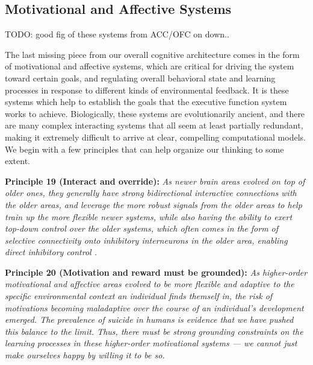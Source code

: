 \documentclass[11pt,twoside]{article}
\begin{document}
\subsection{Motivational and Affective Systems}

TODO: good fig of these systems from ACC/OFC on down..

The last missing piece from our overall cognitive architecture comes
in the form of motivational and affective systems, which are critical
for driving the system toward certain goals, and regulating overall
behavioral state and learning processes in response to different kinds
of environmental feedback.  It is these systems which help to
establish the goals that the executive function system works to
achieve.  Biologically, these systems are evolutionarily ancient, and
there are many complex interacting systems that all seem at least
partially redundant, making it extremely difficult to arrive at clear,
compelling computational models.  We begin with a few principles that
can help organize our thinking to some extent.

{\bf Principle 19 (Interact and override):} {\em As newer brain areas
  evolved on top of older ones, they generally have strong
  bidirectional interactive connections with the older areas, and
  leverage the more robust signals from the older areas to help train
  up the more flexible newer systems, while also having the ability to
  exert top-down control over the older systems, which often comes in
  the form of selective connectivity onto inhibitory interneurons in
  the older area, enabling direct inhibitory control
  \cite{MunakataEtAl11}.}

{\bf Principle 20 (Motivation and reward must be grounded):} {\em As
  higher-order motivational and affective areas evolved to be more
  flexible and adaptive to the specific environmental context an
  individual finds themself in, the risk of motivations becoming
  maladaptive over the course of an individual's development emerged.
  The prevalence of suicide in humans is evidence that we have pushed
  this balance to the limit.  Thus, there must be strong grounding
  constraints on the learning processes in these higher-order
  motivational systems --- we cannot just make ourselves happy by
  willing it to be so.}
\end{document}
